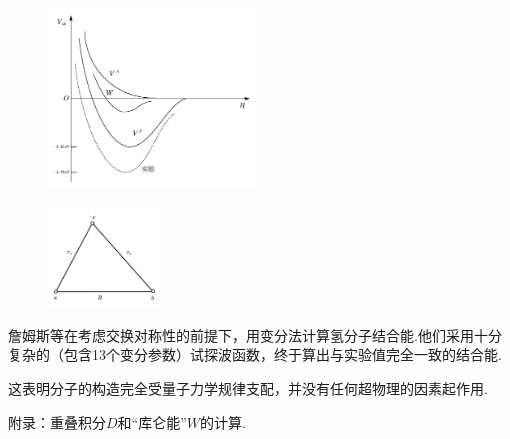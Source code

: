 \begin{figure}[!h]
	\centering
	\small
	\includegraphics[width=5.5cm,clip]{QM file/figure/10-5}
	\caption{}\label{fig.10-5}
\end{figure}
\begin{figure}
	\centering
	\small
	\includegraphics[width=3cm,clip]{QM file/figure/10-6}
	\caption{}\label{fig.10-6}
\end{figure}
詹姆斯等在考虑交换对称性的前提下，用变分法计算氢分子结合能.他们采用十分复杂的（包含13个变分参数）试探波函数，终于算出与实验值完全一致的结合能.

这表明分子的构造完全受量子力学规律支配，并没有任何超物理的因素起作用.

附录：重叠积分$D$和“库仑能”$W$的计算.

